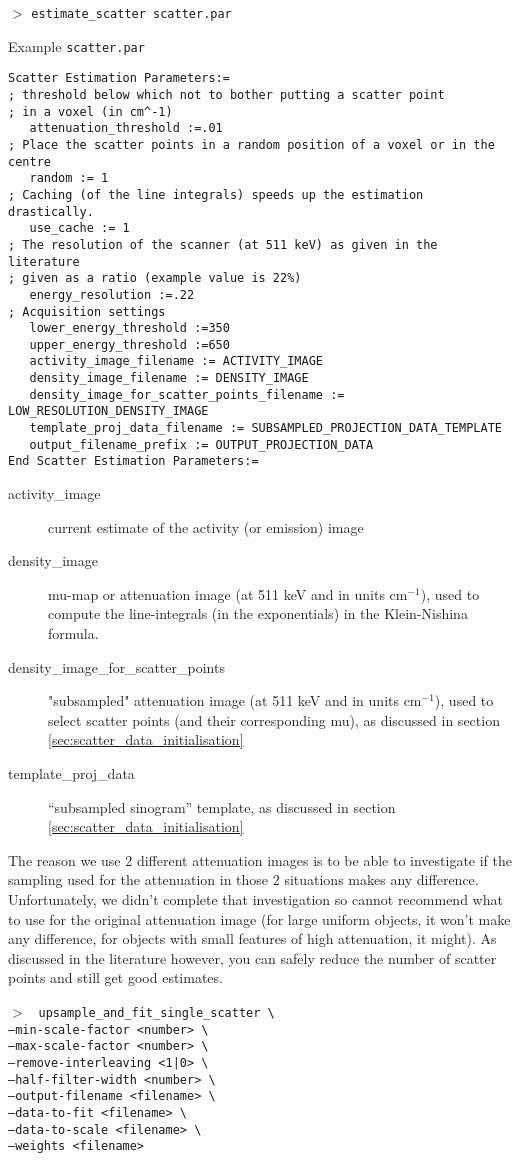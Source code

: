 \documentclass{article}
\newcommand{\cmdline}[1]{\par \noindent $>$ \texttt{#1}\par}
\begin{document}
\cmdline{estimate\_scatter scatter.par}
Example \texttt{scatter.par}
\begin{verbatim}
Scatter Estimation Parameters:=
; threshold below which not to bother putting a scatter point
; in a voxel (in cm^-1)
   attenuation_threshold :=.01
; Place the scatter points in a random position of a voxel or in the centre
   random := 1
; Caching (of the line integrals) speeds up the estimation drastically.
   use_cache := 1
; The resolution of the scanner (at 511 keV) as given in the literature
; given as a ratio (example value is 22%)
   energy_resolution :=.22
; Acquisition settings
   lower_energy_threshold :=350
   upper_energy_threshold :=650
   activity_image_filename := ACTIVITY_IMAGE
   density_image_filename := DENSITY_IMAGE
   density_image_for_scatter_points_filename := LOW_RESOLUTION_DENSITY_IMAGE
   template_proj_data_filename := SUBSAMPLED_PROJECTION_DATA_TEMPLATE
   output_filename_prefix := OUTPUT_PROJECTION_DATA
End Scatter Estimation Parameters:=
\end{verbatim}
\begin{description}
\item[activity\_image]
current estimate of the activity (or emission) image
\item[density\_image] mu-map or attenuation image (at 511 keV and in units cm$^{-1}$),
used to compute the line-integrals (in the exponentials) in the Klein-Nishina formula.
\item[density\_image\_for\_scatter\_points] "subsampled" attenuation image (at 511 keV and in units cm${}^{-1}$), 
used to select scatter points (and their corresponding mu),
as discussed in section \ref{sec:scatter_data_initialisation}
\item[template\_proj\_data]
``subsampled sinogram'' template,
as discussed in section \ref{sec:scatter_data_initialisation}
\end{description}
The reason we use $2$ different attenuation images is to be able to investigate if the sampling used for
the attenuation in those $2$ situations makes any difference. Unfortunately, we didn't complete that
investigation so cannot recommend what to use for the original attenuation image (for large uniform
objects, it won't make any difference, for objects with small features of high attenuation, it might). 
As discussed in the literature however, you can safely reduce the number of scatter points and still get
good estimates. 
\\[1cm]
\cmdline{%
upsample\_and\_fit\_single\_scatter \textbackslash \\
					--min-scale-factor <number> \textbackslash \\
					--max-scale-factor <number> \textbackslash \\
					--remove-interleaving <1|0> \textbackslash \\
					--half-filter-width <number> \textbackslash \\
					--output-filename <filename> \textbackslash \\
					--data-to-fit <filename> \textbackslash \\
					--data-to-scale <filename> \textbackslash \\
					--weights <filename>%
}
\end{document}
